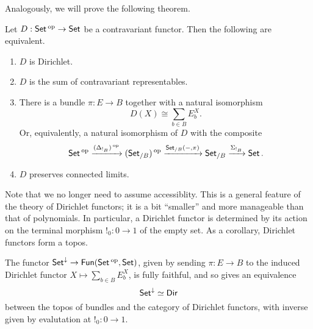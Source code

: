 Analogously, we will prove the following theorem.
\begin{thm}
Let $D : \operatorname{\mathsf{{Set}}}\operatorname{^\textnormal{op}} \to \operatorname{\mathsf{{Set}}}$ be a contravariant functor. Then the following are
equivalent.
\begin{enumerate}
\item $D$ is Dirichlet.
\item $D$ is the sum of contravariant representables.
\item There is a bundle $\pi : E \to B$ together with a natural isomorphism
  $$D(X) \cong \sum_{b \in B} E_b^X.$$
  Or, equivalently, a natural isomorphism of $D$ with the composite
  $$\operatorname{\mathsf{{Set}}}\operatorname{^\textnormal{op}} \xrightarrow{(\Delta_{!_B})\operatorname{^\textnormal{op}}} (\operatorname{\mathsf{{Set}}}_{/B})\operatorname{^\textnormal{op}} \xrightarrow{\operatorname{\mathsf{{Set}}}_{/B}(-, \pi)} \operatorname{\mathsf{{Set}}}_{/B}
  \xrightarrow{\Sigma_{!_B}} \operatorname{\mathsf{{Set}}}.$$
\item $D$ preserves connected limits.
\end{enumerate}
\end{thm}

Note that we no longer need to assume accessiblity. This is a general feature of
the theory of Dirichlet functors; it is a bit ``smaller'' and more manageable
than that of polynomials. In particular, a Dirichlet functor is determined by
its action on the terminal morphism $!_0 : 0 \to 1$ of the empty set. As a corollary, Dirichlet functors form a topos.

\begin{thm}\label{thm:dirichlet.set.equivalence}
The functor $\operatorname{\mathsf{{Set}}}^{\mathbin{\downarrow}} \to \mathsf{{Fun}}(\operatorname{\mathsf{{Set}}}\operatorname{^\textnormal{op}}, \operatorname{\mathsf{{Set}}})$, given by sending $\pi : E
\to B$ to the induced Dirichlet functor $X \mapsto \sum_{b \in B} E_b^X$, is
fully faithful, and so gives an equivalence
$$\operatorname{\mathsf{{Set}}}^{\mathbin{\downarrow}} \simeq \operatorname{\mathsf{{Dir}}}$$
between the topos of bundles and the category of Dirichlet functors, with inverse given by evalutation at
$!_0 : 0 \to 1$.
\end{thm}


